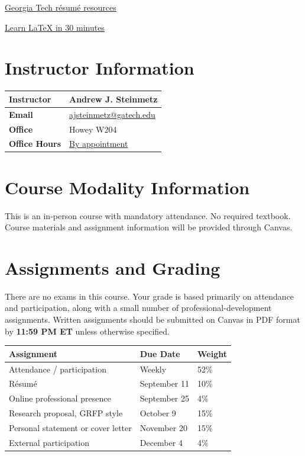 \documentclass[11pt]{article}
\begin{document}
\href{https://career.gatech.edu/resumes/}{Georgia Tech r\'esum\'e resources}

\href{https://www.overleaf.com/learn/latex/Learn_LaTeX_in_30_minutes}{Learn \LaTeX{} in 30 minutes}

\section*{Instructor Information}

\begin{tabularx}{\textwidth}{>{\bfseries}p{} X}
\toprule
Instructor & Andrew J. Steinmetz \\
\midrule
Email & \href{mailto:ajsteinmetz@gatech.edu}{ajsteinmetz@gatech.edu} \\
\midrule
Office & Howey W204 \\
\midrule
Office Hours & \href{https://outlook.office.com/bookwithme/user/118287044b844adb8cb5cfaadd54546f@gatech.edu?anonymous\&ismsaljsauthenabled\&ep=plink}{By appointment} \\
\bottomrule
\end{tabularx}

\newpage

\section*{Course Modality Information}

This is an in-person course with mandatory attendance. No required textbook. Course materials and assignment information will be provided through Canvas.

\section*{Assignments and Grading}

There are no exams in this course. Your grade is based primarily on attendance and participation, along with a small number of professional-development assignments. Written assignments should be submitted on Canvas in PDF format by \textbf{11:59 PM ET} unless otherwise specified.

\begin{center}
\renewcommand{\arraystretch}{1.15}
\begin{tabularx}{0.98\textwidth}{X p{} p{}}
\toprule
\textbf{Assignment} & \textbf{Due Date} & \textbf{Weight} \\
\midrule
Attendance / participation & Weekly & 52\% \\
R\'esum\'e & September 11 & 10\% \\
Online professional presence & September 25 & 4\% \\
Research proposal, GRFP style & October 9 & 15\% \\
Personal statement or cover letter & November 20 & 15\% \\
External participation & December 4 & 4\% \\
\bottomrule
\end{tabularx}
\renewcommand{\arraystretch}{1.0}
\end{center}
\end{document}
